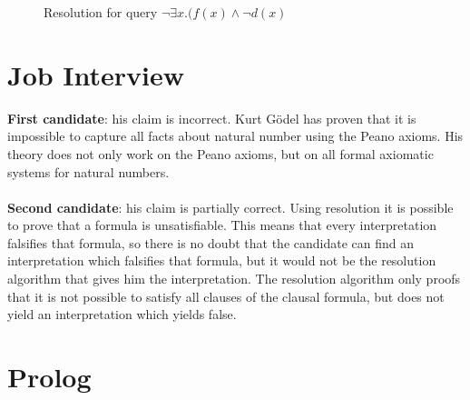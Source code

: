 \documentclass[]{article}
\begin{document}
\begin{figure}[h]
\centering
{}
\caption{Resolution for query $\neg\exists x.(f(x) \wedge\neg d(x)$} \label{fig:Res}
\end{figure}

\section{Job Interview}
\textbf{First candidate}:  his claim is incorrect. Kurt G\"odel has proven that it is impossible to capture all facts about natural number using the Peano axioms. His theory does not only work on the Peano axioms, but on all formal axiomatic systems for natural numbers.\\
\\
\textbf{Second candidate}:  his claim is partially correct. Using resolution it is possible to prove that a formula is unsatisfiable. This means that every interpretation falsifies that formula, so there is no doubt that the candidate can find an interpretation which falsifies that formula, but it would not be the resolution algorithm that gives him the interpretation. The resolution algorithm only proofs that it is not possible to satisfy all clauses of the clausal formula, but does not yield an interpretation which yields false.
\section{Prolog}
\end{document}
